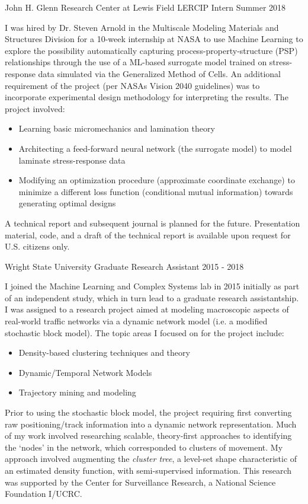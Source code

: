 \documentclass[11pt,a4paper,sans]{moderncv} %
\begin{document}
			 {John H. Glenn Research Center at Lewis Field}
			 {LERCIP Intern}
			 {Summer 2018}{}{\vspace{3pt}
I was hired by Dr. Steven Arnold in the Multiscale Modeling Materials and Structures Division for a 10-week internship at NASA to use Machine Learning to explore the possibility automatically capturing process-property-structure (PSP) relationships through the use of a ML-based surrogate model trained on stress-response data simulated via the Generalized Method of Cells.
An additional requirement of the project (per NASAs Vision 2040 guidelines) was to incorporate experimental design methodology for interpreting the results.  
The project involved:
\begin{itemize}
	\item Learning basic micromechanics and lamination theory
	\item Architecting a feed-forward neural network (the surrogate model) to model laminate stress-response data 
	\item Modifying an optimization procedure (approximate coordinate exchange) to minimize a different loss function (conditional mutual information) towards generating optimal designs
\end{itemize}	
A technical report and subsequent journal is planned for the future. Presentation material, code, and a draft of the technical report is available upon request for U.S. citizens only. 
}


			 {Wright State University}
			 {Graduate Research Assistant}
			 {2015 - 2018}{}
{  \vspace{3pt}
I joined the Machine Learning and Complex Systems lab in 2015 initially as part of an independent study, which in turn lead to a graduate research assistantship. I was assigned to a research project aimed at modeling macroscopic aspects of real-world traffic networks via a dynamic network model (i.e. a modified stochastic block model). The topic areas I focused on for the project include: 
	\begin{itemize}
		\item Density-based clustering techniques and theory 
		\item Dynamic/Temporal Network Models
		\item Trajectory mining and modeling
	\end{itemize}
Prior to using the stochastic block model, the project requiring first converting raw positioning/track information into a dynamic network representation. 
Much of my work involved researching scalable, theory-first approaches to identifying the `nodes' in the network, which corresponded to clusters of movement. My approach involved augmenting the {\em cluster tree}, a level-set shape characteristic of an estimated density function, with semi-supervised information. This research was supported by the Center for Surveillance Research, a National Science Foundation I/UCRC.
}
\end{document}
